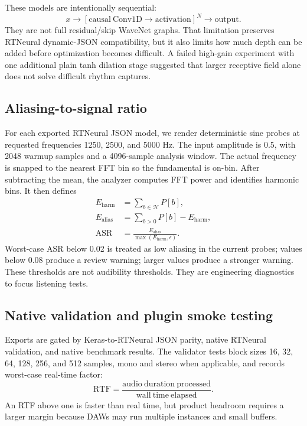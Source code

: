 \documentclass[11pt]{article}
\newcommand{\asr}{\mathrm{ASR}}
\newcommand{\rtf}{\mathrm{RTF}}
\begin{document}
These models are intentionally sequential:
\begin{equation}
  x \rightarrow [\mathrm{causal\ Conv1D} \rightarrow
  \mathrm{activation}]^N \rightarrow \mathrm{output}.
\end{equation}
They are not full residual/skip WaveNet graphs. That limitation preserves
RTNeural dynamic-JSON compatibility, but it also limits how much depth can be
added before optimization becomes difficult. A failed high-gain experiment with
one additional plain tanh dilation stage suggested that larger receptive field
alone does not solve difficult rhythm captures.

\subsection{Aliasing-to-signal ratio}

For each exported RTNeural JSON model, we render deterministic sine probes at
requested frequencies 1250, 2500, and 5000 Hz. The input amplitude is 0.5, with
2048 warmup samples and a 4096-sample analysis window. The actual frequency is
snapped to the nearest FFT bin so the fundamental is on-bin. After subtracting
the mean, the analyzer computes FFT power and identifies harmonic bins. It then
defines
\begin{align}
  E_{\mathrm{harm}} &= \sum_{b\in \mathcal{H}} P[b],\\
  E_{\mathrm{alias}} &= \sum_{b>0} P[b] - E_{\mathrm{harm}},\\
  \asr &= \frac{E_{\mathrm{alias}}}{\max(E_{\mathrm{harm}}, \epsilon)} .
\end{align}
Worst-case ASR below 0.02 is treated as low aliasing in the current probes;
values below 0.08 produce a review warning; larger values produce a stronger
warning. These thresholds are not audibility thresholds. They are engineering
diagnostics to focus listening tests.

\subsection{Native validation and plugin smoke testing}

Exports are gated by Keras-to-RTNeural JSON parity, native RTNeural validation,
and native benchmark results. The validator tests block sizes 16, 32, 64, 128,
256, and 512 samples, mono and stereo when applicable, and records worst-case
real-time factor:
\begin{equation}
  \rtf = \frac{\mathrm{audio\ duration\ processed}}
              {\mathrm{wall\ time\ elapsed}} .
\end{equation}
An RTF above one is faster than real time, but product headroom requires a
larger margin because DAWs may run multiple instances and small buffers.
\end{document}
